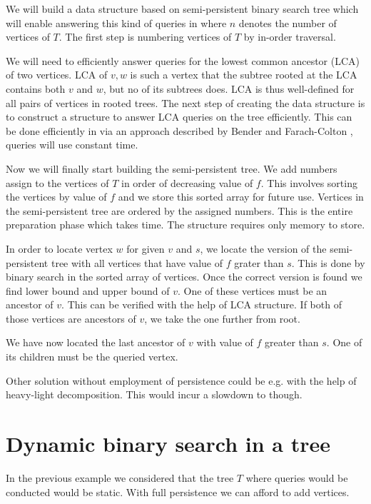 We will build a data structure based on semi-persistent binary search tree which will enable answering this kind of queries in  where $n$ denotes the number of vertices of $T$. The first step is numbering vertices of $T$ by in-order traversal. 

We will need to efficiently answer queries for the lowest common ancestor (LCA) of two vertices. LCA of $v, w$ is such a vertex that the subtree rooted at the LCA contains both $v$ and $w$, but no of its subtrees does. LCA is thus well-defined for all pairs of vertices in rooted trees. The next step of creating the data structure is to construct a structure to answer LCA queries on the tree efficiently. This can be done efficiently in  via an approach described by Bender and Farach-Colton \cite{lca}, queries will use constant time.

Now we will finally start building the semi-persistent tree. We add numbers assign to the vertices of $T$ in order of decreasing value of $f$. This involves sorting the vertices by value of $f$ and we store this sorted array for future use. Vertices in the semi-persistent tree are ordered by the assigned numbers. This is the entire preparation phase which takes  time. The structure requires only  memory to store.

In order to locate vertex $w$ for given $v$ and $s$, we locate the version of the semi-persistent tree with all vertices that have value of $f$ grater than $s$. This is done by binary search in the sorted array of vertices. Once the correct version is found we find lower bound and upper bound of $v$. One of these vertices must be an ancestor of $v$. This can be verified with the help of LCA structure. If both of those vertices are ancestors of $v$, we take the one further from root. 

We have now located the last ancestor of $v$ with value of $f$ greater than $s$. One of its children must be the queried vertex.

Other solution without employment of persistence could be e.g. with the help of heavy-light decomposition. This would incur a slowdown to  though.

\section{Dynamic binary search in a tree}

In the previous example we considered that the tree $T$ where queries would be conducted would be static. With full persistence we can afford to add vertices. %

